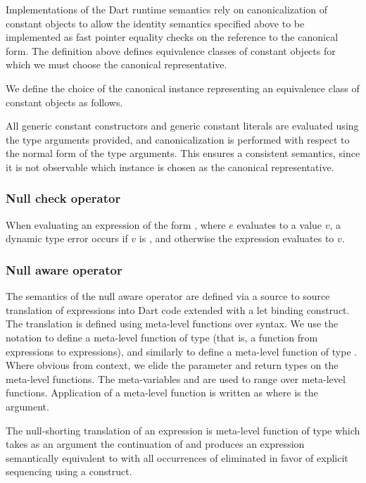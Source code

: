 \documentclass[makeidx]{article}
\begin{document}
{Implementations of the Dart runtime semantics rely on canonicalization of
constant objects to allow the identity semantics specified above to be
implemented as fast pointer equality checks on the reference to the canonical
form.  The definition above defines equivalence classes of constant objects for
which we must choose the canonical representative.

We define the choice of the canonical instance representing an
equivalence class of constant objects as follows.

All generic constant constructors and generic constant
literals are evaluated using the type arguments provided, and canonicalization
is performed with respect to the normal form of the type arguments.  This
ensures a consistent semantics, since it is not observable which instance is
chosen as the canonical representative.

\subsubsection{Null check operator}

When evaluating an expression of the form ,
where $e$ evaluates to a value $v$,
a dynamic type error occurs if $v$ is ,
and otherwise the expression evaluates to $v$.

\subsubsection{Null aware operator}

The semantics of the null aware operator  are defined via a source to source
translation of expressions into Dart code extended with a let binding construct.
The translation is defined using meta-level functions over syntax.  We use the
notation  to define a meta-level function of type  (that is, a function from expressions to expressions), and similarly
 to define a meta-level function of type .  Where obvious from context, we elide the parameter and return
types on the meta-level functions.  The meta-variables  and  are used to
range over meta-level functions.  Application of a meta-level function is
written as  where  is the argument.

The null-shorting translation of an expression  is meta-level function  of
type  which takes as an argument the continuation of  and
produces an expression semantically equivalent to  with all occurrences of
 eliminated in favor of explicit sequencing using a  construct.

}
\end{document}
